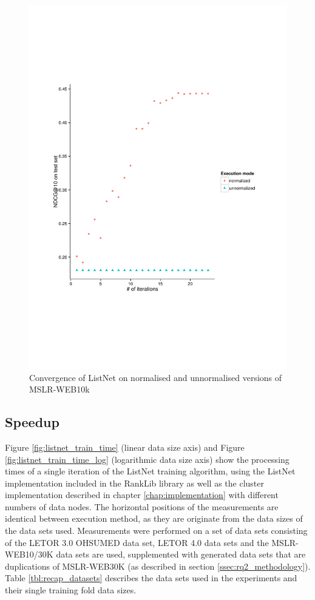 \begin{figure}
\centering
\includegraphics[trim=5cm 5cm 5cm 5cm, scale=0.85]{gfx/convergence_mslr_web10k.pdf}
\caption{Convergence of ListNet on normalised and unnormalised versions of MSLR-WEB10k}
\label{fig:convergence_mslrweb10k}
\end{figure}

\subsection{Speedup}
\label{ssec:speedup}
Figure \ref{fig:listnet_train_time} (linear data size axis) and Figure \ref{fig:listnet_train_time_log} (logarithmic data size axis) show the processing times of a single iteration of the ListNet training algorithm, using the ListNet implementation included in the RankLib library as well as the cluster implementation described in chapter \ref{chap:implementation} with different numbers of data nodes. The horizontal positions of the measurements are identical between execution method, as they are originate from the data sizes of the data sets used. Measurements were performed on a set of data sets consisting of the LETOR 3.0 OHSUMED data set, LETOR 4.0 data sets and the MSLR-WEB10/30K data sets are used, supplemented with generated data sets that are duplications of MSLR-WEB30K (as described in section \ref{ssec:rq2_methodology}). Table \ref{tbl:recap_datasets} describes the data sets used in the experiments and their single training fold data sizes.\\

